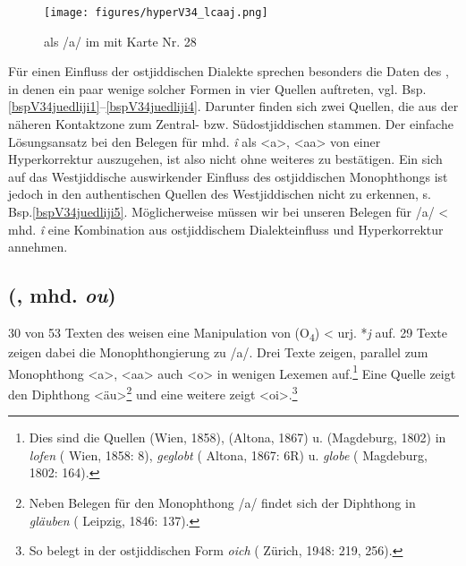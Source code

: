  	\begin{figure}[h!]
		\centering
\texttt{[image: figures/hyperV34\_lcaaj.png]}
		\caption{\label{karteV34hyper}   als /a\textlengthmark/ im  mit  Karte Nr. 28}
		\end{figure}
\FloatBarrier
 
Für einen Einfluss der ostjiddischen Dialekte sprechen besonders die Daten des , in denen ein paar wenige solcher Formen in vier Quellen auftreten, vgl. Bsp. \ref{bspV34juedliji1}–\ref{bspV34juedliji4}.  Darunter finden sich zwei Quellen, die aus der näheren Kontaktzone zum Zentral- bzw. Südostjiddischen stammen. Der einfache Lösungsansatz bei den Belegen für mhd. \textit{î} als <a>, <aa> von einer Hyperkorrektur auszugehen, ist also nicht ohne weiteres zu bestätigen. Ein sich auf das Westjiddische auswirkender Einfluss des ostjiddischen Monophthongs ist jedoch in den authentischen Quellen des Westjiddischen nicht zu erkennen, s. Bsp.\ref{bspV34juedliji5}. Möglicherweise müssen wir bei unseren Belegen für /a\textlengthmark/ < mhd. \textit{î} eine Kombination aus ostjiddischem Dialekteinfluss und Hyperkorrektur annehmen. 


    

 
   
   
 \subsection{ (, mhd. \textit{ou})}\label{phonV44}
30 von 53 Texten des  weisen eine Manipulation von  (O\textsubscript{4}) < urj. *\textit{\textopeno j\textlengthmark} auf. 29 Texte zeigen dabei die Monophthongierung zu /a\textlengthmark/. Drei Texte zeigen, parallel zum Monophthong <a>, <aa> auch <o> in wenigen Lexemen auf.\footnote{Dies sind die Quellen  (Wien, 1858),  (Altona, 1867) u.  (Magdeburg, 1802) in \textit{lofen}  ( Wien, 1858: 8), \textit{geglobt}  ( Altona, 1867: 6R) u. \textit{globe}  ( Magdeburg, 1802: 164).} Eine Quelle zeigt den Diphthong <äu>\footnote{Neben Belegen für den Monophthong /a\textlengthmark/ findet sich der Diphthong in \textit{gläuben}  ( Leipzig, 1846: 137).} und eine weitere zeigt <oi>.\footnote{So belegt in der ostjiddischen Form \textit{oich}  ( Zürich, 1948: 219, 256).} 


